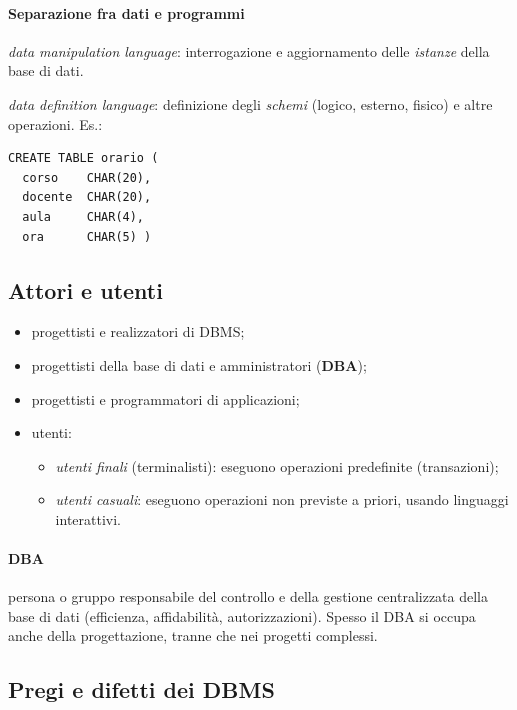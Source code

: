\documentclass[a4paper,12pt]{article}
\begin{document}
\paragraph{Separazione fra dati e programmi}
\begin{description}[style=nextline]
  \item[DML] \emph{data manipulation language}: interrogazione e aggiornamento
    delle \emph{istanze} della base di dati.
  \item[DDL] \emph{data definition language}: definizione degli \emph{schemi}
    (logico, esterno, fisico) e altre operazioni. Es.:
\end{description}
\begin{verbatim}
CREATE TABLE orario (
  corso    CHAR(20),
  docente  CHAR(20),
  aula     CHAR(4),
  ora      CHAR(5) )
\end{verbatim}

\subsection{Attori e utenti}

\begin{itemize}
  \item progettisti e realizzatori di DBMS;
  \item progettisti della base di dati e amministratori (\textbf{DBA});
  \item progettisti e programmatori di applicazioni;
  \item utenti:
    \begin{itemize}
      \item \emph{utenti finali} (terminalisti): eseguono operazioni predefinite
        (transazioni);
      \item \emph{utenti casuali}: eseguono operazioni non previste a priori,
        usando linguaggi interattivi.
    \end{itemize}
\end{itemize}

\paragraph{DBA} persona o gruppo responsabile del controllo e della gestione
centralizzata della base di dati (efficienza, affidabilità, autorizzazioni).
Spesso il DBA si occupa anche della progettazione, tranne che nei progetti
complessi.

\subsection{Pregi e difetti dei DBMS}
\end{document}
